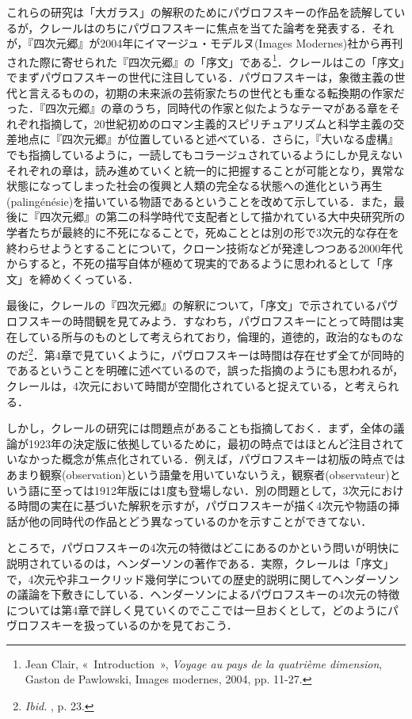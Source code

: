 これらの研究は「大ガラス」の解釈のためにパヴロフスキーの作品を読解しているが，クレールはのちにパヴロフスキーに焦点を当てた論考を発表する．それが，『四次元郷』が2004年にイマージュ・モデルヌ(Images Modernes)社から再刊された際に寄せられた『四次元郷』の「序文」である\footnote{Jean Clair, «~Introduction~», \emph{Voyage au pays de la quatrième dimension}, Gaston de Pawlowski, Images modernes, 2004, pp. 11-27.}．クレールはこの「序文」でまずパヴロフスキーの世代に注目している．パヴロフスキーは，象徴主義の世代と言えるものの，初期の未来派の芸術家たちの世代とも重なる転換期の作家だった．『四次元郷』の章のうち，同時代の作家と似たようなテーマがある章をそれぞれ指摘して，20世紀初めのロマン主義的スピリチュアリズムと科学主義の交差地点に『四次元郷』が位置していると述べている．さらに，『大いなる虚構』でも指摘しているように，一読してもコラージュされているようにしか見えないそれぞれの章は，読み進めていくと統一的に把握することが可能となり，異常な状態になってしまった社会の復興と人類の完全なる状態への進化という再生(palingénésie)を描いている物語であるということを改めて示している．また，最後に『四次元郷』の第二の科学時代で支配者として描かれている大中央研究所の学者たちが最終的に不死になることで，死ぬこととは別の形で3次元的な存在を終わらせようとすることについて，クローン技術などが発達しつつある2000年代からすると，不死の描写自体が極めて現実的であるように思われるとして「序文」を締めくくっている．

最後に，クレールの『四次元郷』の解釈について，「序文」で示されているパヴロフスキーの時間観を見てみよう．すなわち，パヴロフスキーにとって時間は実在している所与のものとして考えられており，倫理的，道徳的，政治的なものなのだ\footnote{\emph{Ibid. }, p. 23.}．第4章で見ていくように，パヴロフスキーは時間は存在せず全てが同時的であるということを明確に述べているので，誤った指摘のようにも思われるが，クレールは，4次元において時間が空間化されていると捉えている，と考えられる．

しかし，クレールの研究には問題点があることも指摘しておく．まず，全体の議論が1923年の決定版に依拠しているために，最初の時点ではほとんど注目されていなかった概念が焦点化されている．例えば，パヴロフスキーは初版の時点ではあまり観察(observation)という語彙を用いていないうえ，観察者(observateur)という語に至っては1912年版には1度も登場しない．別の問題として，3次元における時間の実在に基づいた解釈を示すが，パヴロフスキーが描く4次元や物語の挿話が他の同時代の作品とどう異なっているのかを示すことができてない．

ところで，パヴロフスキーの4次元の特徴はどこにあるのかという問いが明快に説明されているのは，ヘンダーソンの著作である．実際，クレールは「序文」で，4次元や非ユークリッド幾何学についての歴史的説明に関してヘンダーソンの議論を下敷きにしている．ヘンダーソンによるパヴロフスキーの4次元の特徴については第4章で詳しく見ていくのでここでは一旦おくとして，どのようにパヴロフスキーを扱っているのかを見ておこう．

